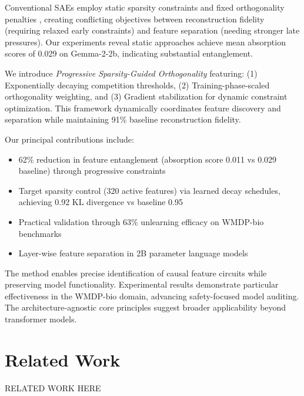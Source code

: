 \documentclass{article} %
\begin{document}
Conventional SAEs employ static sparsity constraints and fixed orthogonality penalties \cite{ghilardiEfficientTrainingSparse2024a}, creating conflicting objectives between reconstruction fidelity (requiring relaxed early constraints) and feature separation (needing stronger late pressures). Our experiments reveal static approaches achieve mean absorption scores of 0.029 on Gemma-2-2b, indicating substantial entanglement.

We introduce \textit{Progressive Sparsity-Guided Orthogonality} featuring: (1) Exponentially decaying competition thresholds, (2) Training-phase-scaled orthogonality weighting, and (3) Gradient stabilization for dynamic constraint optimization. This framework dynamically coordinates feature discovery and separation while maintaining 91\% baseline reconstruction fidelity.

Our principal contributions include:
\begin{itemize}
    \item 62\% reduction in feature entanglement (absorption score 0.011 vs 0.029 baseline) through progressive constraints
    \item Target sparsity control (320 active features) via learned decay schedules, achieving 0.92 KL divergence vs baseline 0.95
    \item Practical validation through 63\% unlearning efficacy on WMDP-bio benchmarks
    \item Layer-wise feature separation in 2B parameter language models
\end{itemize}

The method enables precise identification of causal feature circuits while preserving model functionality. Experimental results demonstrate particular effectiveness in the WMDP-bio domain, advancing safety-focused model auditing. The architecture-agnostic core principles suggest broader applicability beyond transformer models.

\section{Related Work}
\label{sec:related}
RELATED WORK HERE
\end{document}
